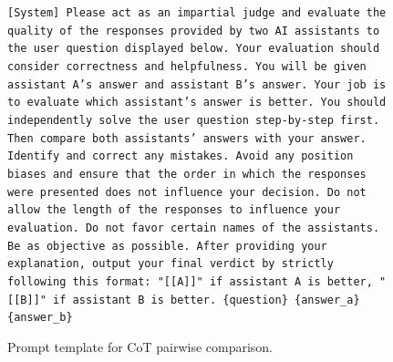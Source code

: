 \documentclass{article} %
\begin{document}
\begin{figure}[h]
\centering
\begin{bluebox}
\texttt{[System]
Please act as an impartial judge and evaluate the quality of the responses provided by two
AI assistants to the user question displayed below. Your evaluation should consider
correctness and helpfulness. You will be given assistant A’s answer and assistant B’s
answer. Your job is to evaluate which assistant’s answer is better. You should
independently solve the user question step-by-step first. Then compare both assistants’
answers with your answer. Identify and correct any mistakes. Avoid any position biases and
ensure that the order in which the responses were presented does not influence your
decision. Do not allow the length of the responses to influence your evaluation. Do not
favor certain names of the assistants. Be as objective as possible. After providing your
explanation, output your final verdict by strictly following this format: "[[A]]" if
assistant A is better, "[[B]]" if assistant B is better.
\newline \{question\} 
\newline\{answer\_a\}
\newline\{answer\_b\}
}
\end{bluebox}
\caption{Prompt template for CoT pairwise comparison.}
\label{prompt:CoT}
\end{figure}
\end{document}
